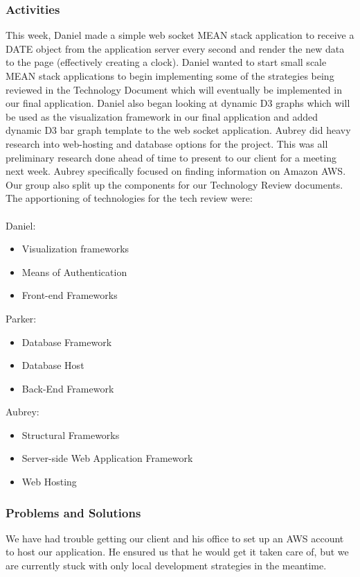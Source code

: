\documentclass[journal,10pt,onecolumn,compsoc]{IEEEtran} \usepackage[margin=1.0in]{geometry} \usepackage{pdfpages}
\begin{document}
    \subsubsection{Activities}
    This week, Daniel made a simple web socket MEAN stack application to receive a DATE object from the application server every second and render the new data to the page (effectively creating a clock). Daniel wanted to start small scale MEAN stack applications to begin implementing some of the strategies being reviewed in the Technology Document which will eventually be implemented in our final application. Daniel also began looking at dynamic D3 graphs which will be used as the visualization framework in our final application and added dynamic D3 bar graph template to the web socket application.
    \noident Aubrey did heavy research into web-hosting and database options for the project. This was all preliminary research done ahead of time to present to our client for a meeting next week. Aubrey specifically focused on finding information on Amazon AWS.
	\noindent Our group also split up the components for our Technology Review documents. The apportioning of technologies for the tech review were: \\\\ %
    \noindent Daniel:
    \begin{itemize}
    \item Visualization frameworks
    \item Means of Authentication
    \item Front-end Frameworks
    \end{itemize}
    
    \noindent Parker:
    \begin{itemize}
    \item Database Framework
    \item Database Host
    \item Back-End Framework
    \end{itemize}
    
    \noindent Aubrey:
    \begin{itemize}
    \item Structural Frameworks
    \item Server-side Web Application Framework
    \item Web Hosting
    \end{itemize}
    
    \subsubsection{Problems and Solutions} 
    We have had trouble getting our client and his office to set up an AWS account to host our application. He ensured us that he would get it taken care of, but we are currently stuck with only local development strategies in the meantime.
\end{document}

